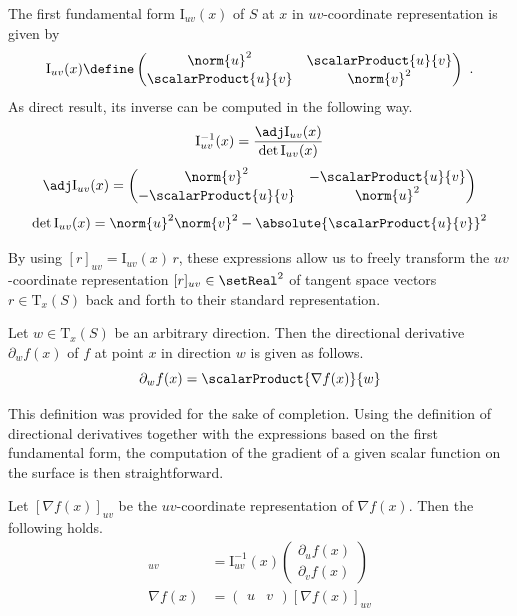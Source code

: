 \documentclass[9pt,fleqn,twoside,twocolumn]{stdglobal}
\begin{document}
  \begin{definition*}
    The first fundamental form $\mathrm{I}_{uv}(x)$ of $S$ at $x$ in $uv$-coordinate representation is given by
    \[
      \mathrm{I}_{uv}(x) \define
      \begin{pmatrix}
        \norm{u}^2 & \scalarProduct{u}{v} \\
        \scalarProduct{u}{v} & \norm{v}^2
      \end{pmatrix} \ .
    \]
    As direct result, its inverse can be computed in the following way.
    \[
      \mathrm{I}^{-1}_{uv}(x) = \frac{\adj \mathrm{I}_{uv}(x)}{\det \mathrm{I}_{uv}(x)}
    \]
    \[
      \adj\mathrm{I}_{uv}(x) =
      \begin{pmatrix}
        \norm{v}^2 & -\scalarProduct{u}{v} \\
        -\scalarProduct{u}{v} & \norm{u}^2
      \end{pmatrix}
    \]
    \[
      \det\mathrm{I}_{uv}(x) = \norm{u}^2\norm{v}^2 - \absolute{\scalarProduct{u}{v}}^2
    \]
  \end{definition*}

  \noindent
  By using $[r]_{uv} = \mathrm{I}_{uv}(x)\, r$, these expressions allow us to freely transform the $uv$-coordinate representation $[r]_{uv}\in\setReal^2$ of tangent space vectors $r\in\mathrm{T}_x(S)$ back and forth to their standard representation.

  \begin{definition*}
    Let $w\in\mathrm{T}_x(S)$ be an arbitrary direction.
    Then the directional derivative $\partial_w f(x)$ of $f$ at point $x$ in direction $w$ is given as follows.
    \[
      \partial_w f(x) = \scalarProduct{\nabla f(x)}{w}
    \]
  \end{definition*}

  \noindent
  This definition was provided for the sake of completion.
  Using the definition of directional derivatives together with the expressions based on the first fundamental form, the computation of the gradient of a given scalar function on the surface is then straightforward.

  \begin{definition*}[(Gradient)]
    Let $[\nabla f(x)]_{uv}$ be the $uv$-coordinate representation of $\nabla f(x)$.
    Then the following holds.
    \begin{align*}
      [\nabla f(x)]_{uv} &= \mathrm{I}^{-1}_{uv}(x)
      \begin{pmatrix}
        \partial_u f(x) \\
        \partial_v f(x)
      \end{pmatrix} \\
      \nabla f(x) &=
      \begin{pmatrix}
        u & v
      \end{pmatrix}
      [\nabla f(x)]_{uv}
    \end{align*}
  \end{definition*}
\end{document}
